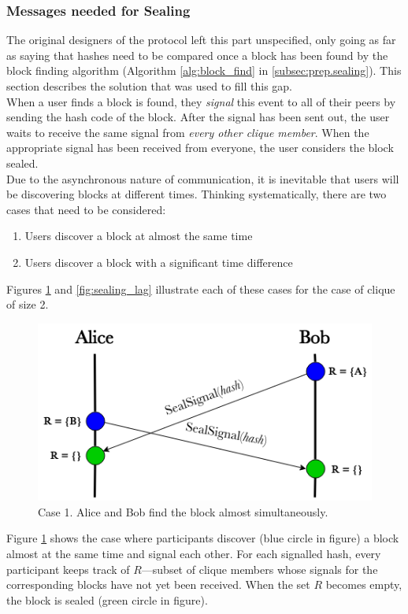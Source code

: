 \documentclass[a4paper, twoside, 12pt]{report}
\begin{document}
\subsubsection{Messages needed for Sealing}
The original designers of the protocol left this part unspecified, only going as far as saying that hashes need to be compared once a block has been found by the block finding algorithm (Algorithm \ref{alg:block_find} in \cref{subsec:prep.sealing}). This section describes the solution that was used to fill this gap. \\

When a user finds a block is found, they \emph{signal} this event to all of their peers by sending the hash code of the block. After the signal has been sent out, the user waits to receive the same signal from \emph{every other clique member}. When the appropriate signal has been received from everyone, the user considers the block sealed. \\

Due to the asynchronous nature of communication, it is inevitable that users will be discovering blocks at different times. Thinking systematically, there are two cases that need to be considered:
\begin{enumerate}
    \item Users discover a block at almost the same time
    \item Users discover a block with a significant time difference
\end{enumerate}
Figures \ref{fig:sealing_simult} and \ref{fig:sealing_lag} illustrate each of these cases for the case of clique of size 2.

\begin{figure}[H]
    \captionsetup{width=0.85\textwidth}
    \centering
    \includegraphics[width=0.6\linewidth]{pics/sealing_simult.png}
    \caption{\label{fig:sealing_simult} Case 1. Alice and Bob find the block almost simultaneously.}
\end{figure}
Figure \ref{fig:sealing_simult} shows the case where participants discover ({\color{blue}blue} circle in figure) a block almost at the same time and signal each other. For each signalled hash, every participant keeps track of $R$---subset of clique members whose signals for the corresponding blocks have not yet been received. When the set $R$ becomes empty, the block is sealed ({\color{deepgreen}green} circle in figure).
\end{document}
